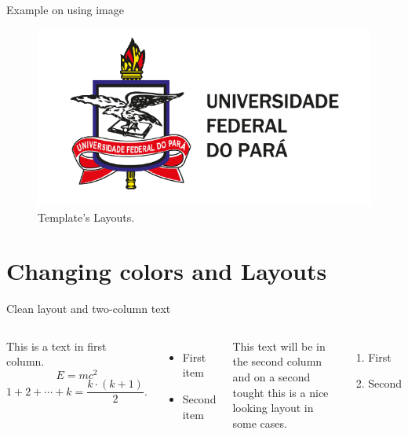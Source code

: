 \begin{frame}{Example on using image}

        \begin{figure}
            \centering
            \includegraphics[width=.9\textwidth]{lib/logos/Brasao-UFPA-com-descritivo-colorido.png}
            \caption{Template's Layouts.}
            \label{fig:layouts}
        \end{figure}

    \end{frame}




    \section{Changing colors and Layouts}


    \begin{frame}{Clean layout and two-column text}

        \begin{columns}

            This is a text in first column.
            $$E=mc^2$$
            $$ 1 + 2 + \cdots + k =  \frac{k \cdot (k + 1)}{2}.$$
            \begin{itemize}
                \item First item

                \item Second item
            \end{itemize}

            This text will be in the second column
            and on a second tought this is a nice looking
            layout in some cases.

            \begin{enumerate}
                \item First
                \item Second
            \end{enumerate}

        \end{columns}

    \end{frame}


